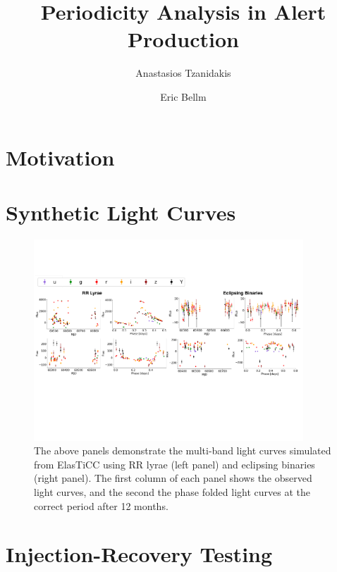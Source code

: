 \documentclass[DM,authoryear,toc]{lsstdoc}
\title{Periodicity Analysis in Alert Production}
\author{%
Anastasios Tzanidakis
}
\author{%
Eric Bellm
}
\date{\vcsDate}
\begin{document}
\maketitle


\section{Motivation}



\section{Synthetic Light Curves}

\begin{figure}
  \includegraphics[width=0.9\textwidth]{figures/lightcurve_demo.pdf}
  \centering 
  \caption{The above panels demonstrate the multi-band light curves simulated from ElasTiCC using RR lyrae (left panel) and eclipsing binaries (right panel). The first column of each panel shows the observed light curves, and the second the phase folded light curves at the correct period after 12 months.}
  \label{fig:comp}
\end{figure}



\section{Injection-Recovery Testing}
\end{document}
